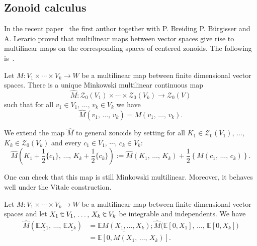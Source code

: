 \documentclass[AHL, Unicode, longabstracts, published]{cedram}
\newcommand{\EE}{\mathbb{E}}
\newcommand{\ZZo}{\mathscr{Z}_0}
\newcommand{\seg}{\underline}
\newcommand*\randin{
\mathchoice {\raisebox{-.35ex}{$\displaystyle{^\subset}$}\mkern-11.5mu\raisebox{+.45ex}{$\displaystyle{_\subset}$}} {\mkern+1mu\raisebox{-.27ex}{$\textstyle{^\subset}$}\mkern-11.7mu\raisebox{+.45ex}{$\textstyle{_\subset}$}} {\raisebox{.35ex}{$\scriptstyle\subset$}\mkern-14mu\raisebox{-.15ex}{$\scriptstyle\subset$}} {\raisebox{.3ex}{$\scriptscriptstyle\subset$}\mkern-13.5mu\raisebox{-.10ex}{$\scriptscriptstyle\subset$}}}
\begin{document}
\subsection{Zonoid calculus}\label{sub:zonoidcalc}


In the recent paper~\cite{ZA} the first author together with P. Breiding P. B\"urgisser and A. Lerario proved that multilinear maps between vector spaces give rise to multilinear maps on the corresponding spaces of centered zonoids. The following is~\cite[Theorem~4.1]{ZA}.

\begin{prop}\label{thm:FTZC}
Let $M:V_1\times\cdots\times V_k\to W$ be a multilinear map between finite dimensional vector spaces. There is a unique Minkowski multilinear continuous map
\begin{equation*}
\widehat{M}:\ZZo(V_1)\times\cdots\times\ZZo(V_k)\to \ZZo(V)
\end{equation*}
such that for all $v_1\in V_1,\,\ldots,\,v_k\in V_k$ we have
\begin{equation*}
\widehat{M}\left(\seg{v_1},\,\ldots,\,\seg{v_k}\right)=\seg{M(v_1,\,\ldots,\,v_k)}.
\end{equation*}
\end{prop}

We extend the map $\widehat{M}$ to general zonoids by setting for all $K_1\in\ZZo(V_1)$, $\ldots$, $K_k\in\ZZo(V_k)$ and every $c_1\in V_1,\,\cdots,\, c_k\in V_k$:
\begin{equation}\label{eq:Mnotcent}
\widehat{M}\left(K_1+\frac{1}{2}\{c_1\},\,\ldots,\,K_k+\frac{1}{2}\{c_k\}\right):=\widehat{M}\left(K_1,\,\ldots,\,K_k\right)+\frac{1}{2}\left\{M(c_1,\,\ldots,\,c_k)\right\}.
\end{equation}

One can check that this map is still Minkowski multilinear. Moreover, it behaves well under the Vitale construction.

\begin{prop}\label{prop:multandVit}
Let $M:V_1\times\cdots\times V_k\to W$ be a multilinear map between finite dimensional vector spaces and let $X_1\,\randin\, V_1,\,\ldots,\,X_k\,\randin\, V_k$ be integrable and independents. We have
\begin{align*}
\widehat{M}\left(\EE\seg{X_1},\,\ldots,\,\EE\seg{X_k}\right)&=\seg{\EE M(X_1,\ldots,X_k)}; \widehat{M}\big(\EE[0,X_1],\,\ldots,\,\EE[0,X_k]\big)\\
&=\EE[0,M(X_1,\,\ldots,\,X_k)].
\end{align*}
\end{prop}
\end{document}
